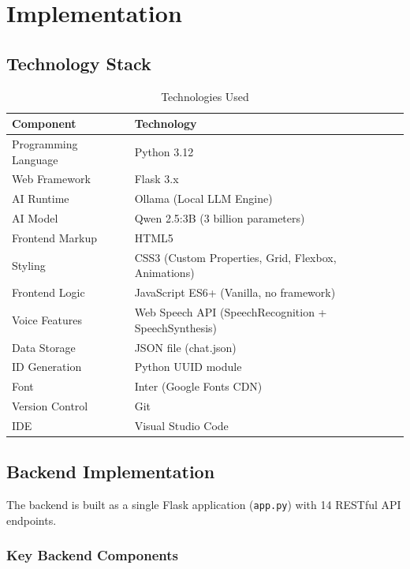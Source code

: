 \documentclass[12pt,a4paper]{report}
\begin{document}
\chapter{Implementation}

\section{Technology Stack}

\begin{table}[h!]
\centering
\caption{Technologies Used}
\begin{tabularx}{\textwidth}{|l|X|}
\hline
\textbf{Component} & \textbf{Technology} \\
\hline
Programming Language & Python 3.12 \\
\hline
Web Framework & Flask 3.x \\
\hline
AI Runtime & Ollama (Local LLM Engine) \\
\hline
AI Model & Qwen 2.5:3B (3 billion parameters) \\
\hline
Frontend Markup & HTML5 \\
\hline
Styling & CSS3 (Custom Properties, Grid, Flexbox, Animations) \\
\hline
Frontend Logic & JavaScript ES6+ (Vanilla, no framework) \\
\hline
Voice Features & Web Speech API (SpeechRecognition + SpeechSynthesis) \\
\hline
Data Storage & JSON file (chat.json) \\
\hline
ID Generation & Python UUID module \\
\hline
Font & Inter (Google Fonts CDN) \\
\hline
Version Control & Git \\
\hline
IDE & Visual Studio Code \\
\hline
\end{tabularx}
\end{table}

\section{Backend Implementation}

The backend is built as a single Flask application (\texttt{app.py}) with 14 RESTful API endpoints.

\subsection{Key Backend Components}
\end{document}
